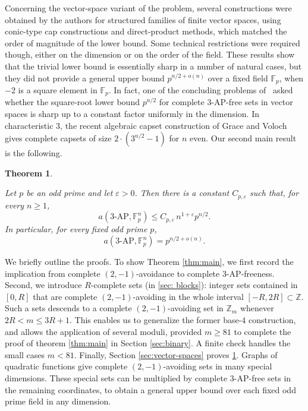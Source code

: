 \documentclass[11pt]{article}
\newtheorem{theorem}{Theorem}[section]
\newcommand{\Z}{\mathbb Z}
\newcommand{\F}{\mathbb F}
\begin{document}
	Concerning the vector-space variant of the problem, several  constructions were obtained by the authors \cite{CsajbokNagy2025} for structured families of finite vector spaces, using conic-type cap constructions and direct-product methods, which matched the order of magnitude of the lower bound. Some technical restrictions were required  though, either on the dimension or on the order of the field.
	These results show that the trivial lower bound is essentially sharp in a number of natural cases, but they did not provide a general upper bound   $p^{n/2+o(n)}$ over a fixed field $\F_p$, when $-2$ is a square element in $\F_p$. In fact, one of the concluding problems of~\cite{CsajbokNagy2025} asked whether the square-root lower bound $p^{n/2}$ for complete \(3\)-AP-free sets in vector spaces is sharp up to a constant factor uniformly in the dimension. In characteristic \(3\), the recent algebraic capset construction of Grace and Voloch~\cite{GraceVoloch2026} gives complete capsets of size  $2\cdot (3^{n/2}-1)$ for $n$ even. Our second main result is the following.
	
	\begin{theorem}
		\label{thm:vector-main}
		
		Let \(p\) be an odd prime and let \(\varepsilon>0\).  Then there is a constant
		\(C_{p,\varepsilon}\) such that, for every \(n\ge1\),
		\[
		a(3\text{-}\mathrm{AP},\mathbb F_p^n)
		\le
		C_{p,\varepsilon}\,n^{1+\varepsilon}p^{n/2}.
		\]
		In particular, for every fixed odd prime \(p\),
		\[
		a(3\text{-}\mathrm{AP},\mathbb F_p^n)
		=
		p^{n/2+o(n)}.
		\]
	\end{theorem}
	
	
	We briefly outline the proofs.  To show Theorem \ref{thm:main}, we first record the implication from complete $(2,-1)$-avoidance to complete $3$-AP-freeness.  Second, we introduce $R$-complete sets (in \cref{sec: blocks}): integer sets contained in $[0,R]$ that are complete $(2,-1)$-avoiding in the whole interval $[-R,2R]\subset \Z$.  Such a sets descends to a complete $(2,-1)$-avoiding set in $\Z_m$ whenever $2R<m\le 3R+1$.  This enables us to generalize the former base-$4$  construction, and allows the application of several moduli, provided $m\ge 81$ to complete the proof of theorem \cref{thm:main} in Section \ref{sec:binary}.  A finite check handles the small cases $m<81$.  Finally,  Section \ref{sec:vector-spaces} proves \cref{thm:vector-main}.
	Graphs of quadratic functions 
	give complete  $(2,-1)$-avoiding sets in many special dimensions.  These special sets can be multiplied by complete $3$-AP-free sets in the remaining coordinates, to  obtain a general upper  bound over each fixed odd prime field in any dimension.
	
\end{document}

